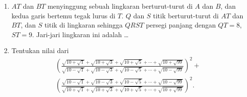 \documentclass[11pt]{scrartcl}
\begin{document}
\begin{enumerate}
    \item $AT$ dan $BT$ menyinggung sebuah lingkaran berturut-turut di $A$ dan $B$, dan kedua garis bertemu tegak lurus di $T$. $Q$ dan $S$ titik berturut-turut di $AT$ dan $BT$, dan $S$ titik di lingkaran sehingga $QRST$ persegi panjang dengan $QT = 8$, $ST = 9$. Jari-jari lingkaran ini adalah \ldots
    
    \item Tentukan nilai dari 
    \begin{align*}
        \left(\frac{\sqrt{10+\sqrt{1}}+\sqrt{10+\sqrt{3}}+\sqrt{10+\sqrt{5}}+\cdots+\sqrt{10+\sqrt{99}}}{\sqrt{10-\sqrt{1}}+\sqrt{10-\sqrt{3}}+\sqrt{10-\sqrt{5}}+\cdots+\sqrt{10-\sqrt{99}}}\right)^{2}
    +\\ \left(\frac{\sqrt{10-\sqrt{1}}+\sqrt{10-\sqrt{3}}+\sqrt{10-\sqrt{5}}+\cdots+\sqrt{10-\sqrt{99}}}{\sqrt{10+\sqrt{1}}+\sqrt{10+\sqrt{3}}+\sqrt{10+\sqrt{5}}+\cdots+\sqrt{10+\sqrt{99}}}\right)^{2}.
    \end{align*}

\end{enumerate}
\end{document}
